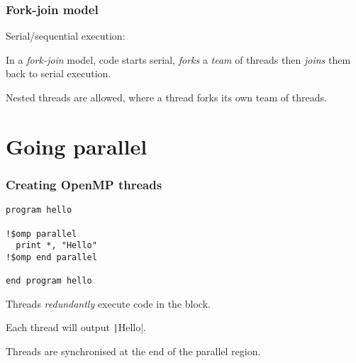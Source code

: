 \documentclass{beamer}
\begin{document}
\begin{frame}
\frametitle{Fork-join model}
Serial/sequential execution:
\begin{center}
\end{center}

\pause

In a \emph{fork-join} model, code starts serial, \emph{forks} a \emph{team} of threads then \emph{joins} them back to serial execution.
\begin{center}
\end{center}

Nested threads are allowed, where a thread forks its own team of threads.
\end{frame}

\section{Going parallel}
\begin{frame}[fragile]
\frametitle{Creating OpenMP threads}
\begin{verbatim}
program hello

!$omp parallel
  print *, "Hello"
!$omp end parallel

end program hello
\end{verbatim}

Threads \emph{redundantly} execute code in the block.

Each thread will output \texttt|Hello|.

Threads are synchronised at the end of the parallel region.

\end{frame}
\end{document}
